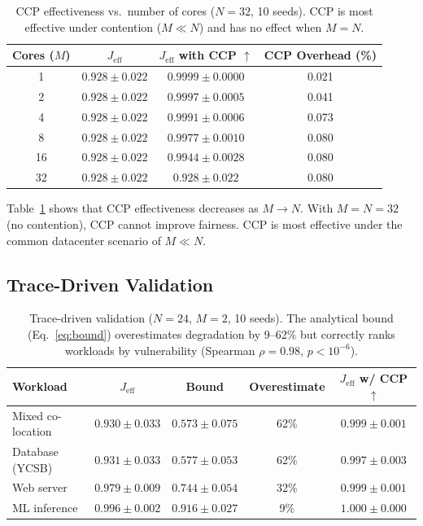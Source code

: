 \documentclass{article}
\newcommand{\jeff}{J_{\mathrm{eff}}}
\begin{document}
\begin{table}[t]
\caption{CCP effectiveness vs.\ number of cores ($N = 32$, 10 seeds). CCP is most effective under contention ($M \ll N$) and has no effect when $M = N$.}
\label{tab:ablation_cores}
\centering
\begin{tabular}{cccc}
\toprule
Cores ($M$) & $\jeff$ & $\jeff$ with CCP $\uparrow$ & CCP Overhead (\%) \\
\midrule
1 & $0.928 \pm 0.022$ & $\mathbf{0.9999 \pm 0.0000}$ & 0.021 \\
2 & $0.928 \pm 0.022$ & $0.9997 \pm 0.0005$ & 0.041 \\
4 & $0.928 \pm 0.022$ & $0.9991 \pm 0.0006$ & 0.073 \\
8 & $0.928 \pm 0.022$ & $0.9977 \pm 0.0010$ & 0.080 \\
16 & $0.928 \pm 0.022$ & $0.9944 \pm 0.0028$ & 0.080 \\
32 & $0.928 \pm 0.022$ & $0.928 \pm 0.022$ & 0.080 \\
\bottomrule
\end{tabular}
\end{table}

Table~\ref{tab:ablation_cores} shows that CCP effectiveness decreases as $M \to N$. With $M = N = 32$ (no contention), CCP cannot improve fairness. CCP is most effective under the common datacenter scenario of $M \ll N$.

\subsection{Trace-Driven Validation}
\label{sec:analytical_validation}

\begin{table}[t]
\caption{Trace-driven validation ($N = 24$, $M = 2$, 10 seeds). The analytical bound (Eq.~\ref{eq:bound}) overestimates degradation by 9--62\% but correctly ranks workloads by vulnerability (Spearman $\rho = 0.98$, $p < 10^{-6}$).}
\label{tab:traces}
\centering
\begin{tabular}{lcccc}
\toprule
Workload & $\jeff$ & Bound & Overestimate & $\jeff$ w/ CCP $\uparrow$ \\
\midrule
Mixed co-location & $0.930 \pm 0.033$ & $0.573 \pm 0.075$ & 62\% & $\mathbf{0.999 \pm 0.001}$ \\
Database (YCSB) & $0.931 \pm 0.033$ & $0.577 \pm 0.053$ & 62\% & $0.997 \pm 0.003$ \\
Web server & $0.979 \pm 0.009$ & $0.744 \pm 0.054$ & 32\% & $\mathbf{0.999 \pm 0.001}$ \\
ML inference & $0.996 \pm 0.002$ & $0.916 \pm 0.027$ & 9\% & $\mathbf{1.000 \pm 0.000}$ \\
\bottomrule
\end{tabular}
\end{table}
\end{document}

